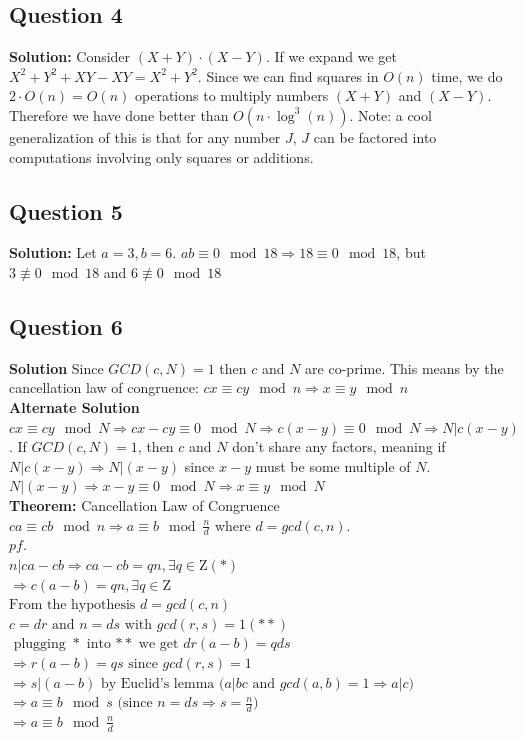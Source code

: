 \documentclass{article}
\begin{document}
\subsection*{Question 4}
\textbf{Solution:} Consider $(X+Y) \cdot (X-Y)$. If we expand we get $X^2 + Y^2 + XY - XY = X^2 + Y^2$. Since we can find squares in $O(n)$ time, we do $2\cdot O(n) = O(n)$ operations to multiply numbers $(X+Y)$ and $(X-Y)$. Therefore we have done better than $O(n \cdot \log^3(n))$. Note: a cool generalization of this is that for any number $J$, $J$ can be factored into computations involving only squares or additions. 

\subsection*{Question 5}
\textbf{Solution:} Let $a = 3, b = 6$. $ab \equiv 0 \mod 18 \Rightarrow 18 \equiv 0 \mod 18$, but $3 \not\equiv 0 \mod 18$ and $6 \not\equiv 0 \mod 18$

\subsection*{Question 6}
\textbf{Solution} Since $GCD(c,N) = 1$ then $c$ and $N$ are co-prime. This means by the cancellation law of congruence: $cx \equiv cy \mod n \Rightarrow x \equiv y \mod n$\\

\noindent \textbf{Alternate Solution} $cx \equiv cy \mod N \Rightarrow cx-cy \equiv 0 \mod N \Rightarrow c(x-y) \equiv 0 \mod N \Rightarrow N | c(x-y)$. If $GCD(c,N) = 1$, then $c$ and $N$ don't share any factors, meaning if $N|c(x-y) \Rightarrow N|(x-y)$ since $x-y$ must be some multiple of $N$. $N|(x-y) \Rightarrow x-y \equiv 0 \mod N \Rightarrow x \equiv y \mod N$\\ 

\noindent \textbf{Theorem:} Cancellation Law of Congruence \\
$ca \equiv cb \mod n \Rightarrow a \equiv b \mod \frac{n}{d}$ where $d = gcd(c,n)$.\\

    \noindent$pf.$\\
    $n | ca-cb \Rightarrow ca-cb = qn, \exists q \in \mathrm{Z} (*)$\\
    $\Rightarrow c(a-b) = qn, \exists q \in \mathrm{Z}$\\
    $\text{From the hypothesis } d = gcd(c,n)$\\
    $c = dr \text{ and } n = ds \text{ with } gcd(r,s) = 1 (**)$\\
    $\text{ plugging $*$ into $**$ we get } dr(a-b) = qds$\\
    $\Rightarrow r(a-b) = qs \text{ since } gcd(r,s) = 1$\\
    $\Rightarrow s | (a-b) \text{ by Euclid's lemma ($a | bc \text{ and } gcd(a,b)=1 \Rightarrow a|c$) }$\\
    $\Rightarrow a \equiv b \mod s \text{ (since } n = ds \Rightarrow s = \frac{n}{d} \text{)}$\\
    $\Rightarrow a \equiv b \mod \frac{n}{d}$
\end{document}
